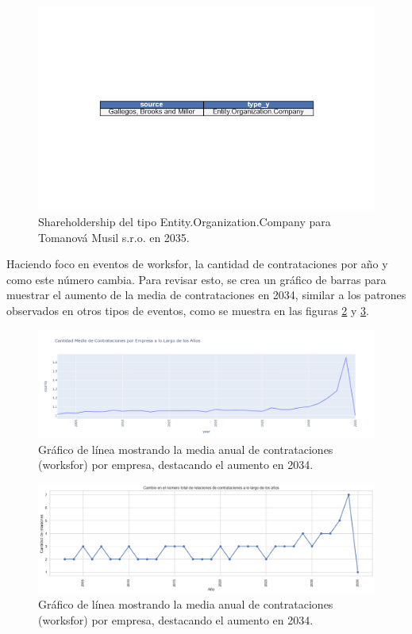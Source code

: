 \documentclass[11pt,spanish,a4paper]{article}
\begin{document}
\begin{figure}[H]
  \centering
  \includegraphics[width=0.7\linewidth]{graphs/entity_company_shareholder_tomanova.png}
  \caption{Shareholdership del tipo Entity.Organization.Company para Tomanová Musil s.r.o. en 2035.}
  \label{fig:entity_company_shareholder_tomanova}
\end{figure}


Haciendo foco en eventos de worksfor, la cantidad de contrataciones por año y como este número cambia. Para revisar esto, se crea un gráfico de barras para muestrar el aumento de la media de contrataciones en 2034, similar a los patrones observados en otros tipos de eventos, como se muestra en las figuras \ref{fig:contrataciones_2001_2035} y \ref{fig:contrataciones_2001_2035_v2}.

\begin{figure}[H]
  \centering
  \includegraphics[width=0.7\linewidth]{graphs/promedio_cambio_contrataciones.png}
  \caption{Gráfico de línea mostrando la media anual de contrataciones (worksfor) por empresa, destacando el aumento en 2034.}
  \label{fig:contrataciones_2001_2035}
\end{figure}

\begin{figure}[H]
  \centering
  \includegraphics[width=0.7\linewidth]{graphs/promedio_cambio_contrataciones_v2.png}
  \caption{Gráfico de línea mostrando la media anual de contrataciones (worksfor) por empresa, destacando el aumento en 2034.}
  \label{fig:contrataciones_2001_2035_v2}
\end{figure}
\end{document}
